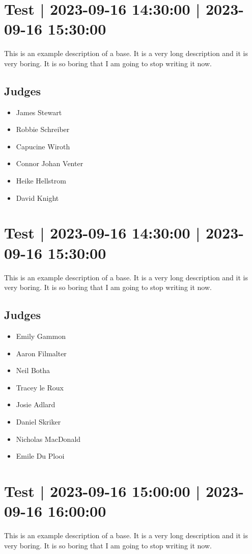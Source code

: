 \documentclass[10pt]{article}
\begin{document}
			\setcounter{section}{7}
	\section{Test | 2023-09-16 14:30:00 | 2023-09-16 15:30:00}
	This is an example description of a base. It is a very long description and it is very boring. It is so boring that I am going to stop writing it now.

	\subsection*{Judges}
	\begin{itemize}

			\item James Stewart
			\item Robbie Schreiber
			\item Capucine Wiroth
			\item Connor Johan Venter
			\item Heike Hellstrom
			\item David Knight
		\end{itemize}

			\setcounter{section}{8}
	\section{Test | 2023-09-16 14:30:00 | 2023-09-16 15:30:00}
	This is an example description of a base. It is a very long description and it is very boring. It is so boring that I am going to stop writing it now.

	\subsection*{Judges}
	\begin{itemize}

			\item Emily Gammon
			\item Aaron Filmalter
			\item Neil Botha
			\item Tracey le Roux
			\item Josie Adlard
			\item Daniel Skriker
			\item Nicholas MacDonald
			\item Emile Du Plooi
		\end{itemize}

			\setcounter{section}{9}
	\section{Test | 2023-09-16 15:00:00 | 2023-09-16 16:00:00}
	This is an example description of a base. It is a very long description and it is very boring. It is so boring that I am going to stop writing it now.
\end{document}
